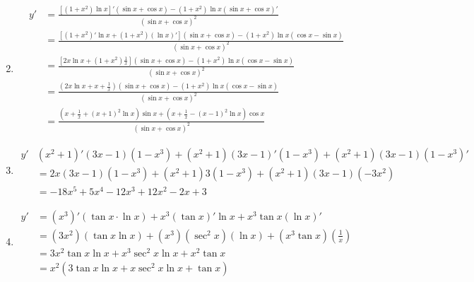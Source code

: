 \begin{solution}
\begin{enumerate}
\begin{align*}
              \end{align*}
        \item \begin{align*}
                  y' & = \frac{[(1+x^2)\ln x]'(\sin x + \cos x) - (1+x^2)\ln x (\sin x + \cos x)'}{(\sin x + \cos x)^2}                  \\
                     & = \frac{[(1+x^2)'\ln x + (1+x^2)(\ln x)'](\sin x + \cos x) - (1+x^2)\ln x (\cos x - \sin x)}{(\sin x + \cos x)^2} \\
                     & = \frac{[2x \ln x + (1+x^2)\frac{1}{x}](\sin x + \cos x) - (1+x^2)\ln x (\cos x - \sin x)}{(\sin x + \cos x)^2}   \\
                     & = \frac{(2x \ln x + x + \frac{1}{x})(\sin x + \cos x) - (1+x^2)\ln x (\cos x - \sin x)}{(\sin x + \cos x)^2}\\
                     & = \frac{\left(x+\frac{1}{x}+(x+1)^2\ln x\right)\sin x +\left(x+\frac{1}{x}-(x-1)^2\ln x\right)\cos x}{(\sin x + \cos x)^2}
              \end{align*}
        \item \begin{align*}
                  y' &  (x^2+1)'(3x-1)(1-x^3)+(x^2+1)(3x-1)'(1-x^3)+(x^2+1)(3x-1)(1-x^3)'\\
                     & = 2x (3x-1)(1-x^3) + (x^2+1)3(1-x^3) + (x^2+1)(3x-1)(-3x^2)\\
                     & = -18 x^5+5 x^4-12 x^3+12 x^2-2 x+3
              \end{align*}
        \item \begin{align*}
                  y' & = (x^3)' (\tan x \cdot \ln x) + x^3 (\tan x)' \ln x + x^3 \tan x (\ln x)'                  \\
                     & = (3x^2) (\tan x \ln x) + (x^3) (\sec^2 x) (\ln x) + (x^3 \tan x) \left(\frac{1}{x}\right) \\
                     & = 3x^2 \tan x \ln x + x^3 \sec^2 x \ln x + x^2 \tan x                                      \\
                     & =x^2(3\tan x \ln x+ x \sec^2 x \ln x + \tan x)
              \end{align*}
    \end{enumerate}
\end{solution}


